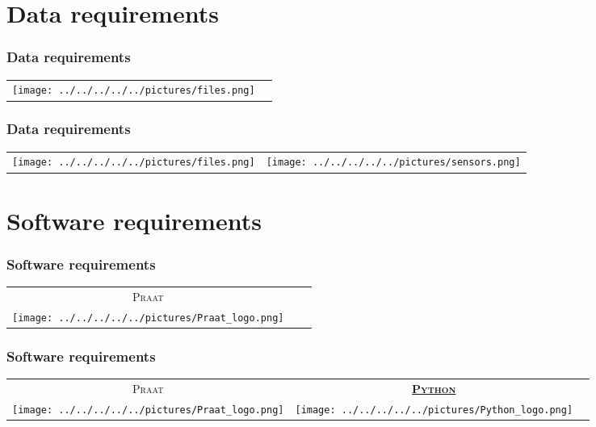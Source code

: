 \documentclass[12pt,a4paper]{beamer}
\begin{document}
\section{Data requirements}
\begin{frame}
    \frametitle{Data requirements}
    \centering
    \begin{tabular}{cc}
        {\texttt{[image: ../../../../../pictures/files.png]}} & \quad\quad\quad\quad\quad\quad\quad\quad\quad\quad\quad\quad\quad\quad\quad\quad\quad\quad\quad\quad \\
    \end{tabular}
\end{frame}

\begin{frame}
    \frametitle{Data requirements}
    \centering
    \begin{tabular}{cc}
        {\texttt{[image: ../../../../../pictures/files.png]}} & {\texttt{[image: ../../../../../pictures/sensors.png]}} \\
    \end{tabular}
\end{frame}

\section{Software requirements}
\begin{frame}
    \frametitle{Software requirements}
    \centering
    \begin{tabular}{ccc}
        \textsc{Praat} & \hspace{5cm} & \\
        \texttt{[image: ../../../../../pictures/Praat\_logo.png]}
    \end{tabular}
\end{frame}

\begin{frame}
    \frametitle{Software requirements}
    \centering
    \begin{tabular}{ccc}
        \textsc{Praat} & \href{https://www.python.org/}{\textbf{\textsc{Python}}} & \hspace{2cm} \\
        \texttt{[image: ../../../../../pictures/Praat\_logo.png]} & 
        \texttt{[image: ../../../../../pictures/Python\_logo.png]} &
        \\
    \end{tabular}
\end{frame}
\end{document}
